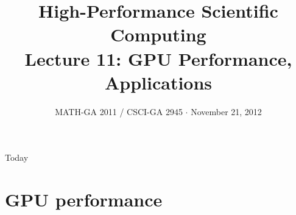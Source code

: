 \documentclass[english,compress]{beamer}
\begin{document}

\title{High-Performance Scientific Computing\\Lecture 11: GPU Performance, Applications}

\date{MATH-GA 2011 / CSCI-GA 2945 $\cdot$ November 21, 2012}

\frame{\titlepage}

\begin{frame}{Today}
  \tableofcontents[hideallsubsections]
\end{frame}
\begin{comment}
\begin{frame}{Bits and pieces}
  \begin{itemize}
    \item Don't have a project? Let's fix that \emph{very soon}
    \item HW5: soon
    \item HW6: due today
    \item Dec 5: Last day of regular class
    \item Dec 12: Legislative Day
    \item Dec 17/18/\textbf{19}: Project presentations
    \item Don't have grade reports for HW1\dots4? Talk to me
  \end{itemize}
\end{frame}
\end{comment}

\begin{comment}
\section[Version Control]{Tool of the day: Advanced Version Control}
\begin{frame}{Git tricks}
  \begin{center}
  \Huge Version control demo time
  \end{center}
\end{frame}
\end{comment}
\section{GPU performance}
\end{document}
